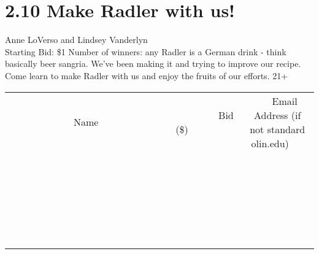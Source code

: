 \documentclass[11pt]{article}
\begin{document}
\section*{2.10 Make Radler with us!}
Anne LoVerso and Lindsey Vanderlyn
\\
Starting Bid: \$1
\newline
Number of winners: any
\newline
Radler is a German drink - think basically beer sangria.  We've been making it and trying to improve our recipe.  Come learn to make Radler with us and enjoy the fruits of our efforts. 21+
\\[6ex]
\begin{tabular}{c c c}
~~~~~~~~~~~~~Name~~~~~~~~~~~~~ & ~~~~~~~~~Bid (\$)~~~~~~~~~  & ~~~Email Address (if not standard olin.edu)~~~\\
 & & \\
\hline
 & & \\
\hline
 & & \\
\hline
 & & \\
\hline
 & & \\
\hline
 & & \\
\hline
 & & \\
\hline
 & & \\
\hline
 & & \\
\hline
 & & \\
\hline
 & & \\
\hline
 & & \\
\hline
 & & \\
\hline
 & & \\
\hline
 & & \\
\hline
 & & \\
\hline
 & & \\
\hline
 & & \\
\hline
 & & \\
\hline
 & & \\
\hline
 & & \\
\hline
 & & \\
\hline
 & & \\
\hline
 & & \\
\hline
 & & \\
\hline
 & & \\
\hline
\end{tabular}
\newpage
\end{document}
